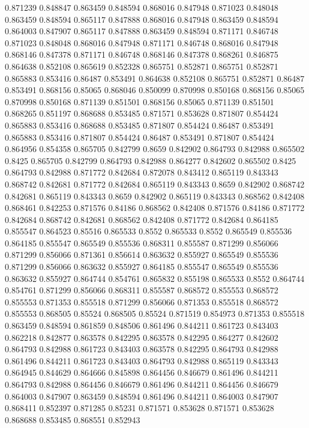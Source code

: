 0.871239 0.848847
0.863459 0.848594
0.868016 0.847948
0.871023 0.848048
0.863459 0.848594
0.865117 0.847888
0.868016 0.847948
0.863459 0.848594
0.864003 0.847907
0.865117 0.847888
0.863459 0.848594
0.871171 0.846748
0.871023 0.848048
0.868016 0.847948
0.871171 0.846748
0.868016 0.847948
0.868146 0.847378
0.871171 0.846748
0.868146 0.847378
0.868261 0.846875
0.864638 0.852108
0.865619 0.852328
0.865751 0.852871
0.865751 0.852871
0.865883 0.853416
0.86487 0.853491
0.864638 0.852108
0.865751 0.852871
0.86487 0.853491
0.868156 0.85065
0.868046 0.850099
0.870998 0.850168
0.868156 0.85065
0.870998 0.850168
0.871139 0.851501
0.868156 0.85065
0.871139 0.851501
0.868265 0.851197
0.868688 0.853485
0.871571 0.853628
0.871807 0.854424
0.865883 0.853416
0.868688 0.853485
0.871807 0.854424
0.86487 0.853491
0.865883 0.853416
0.871807 0.854424
0.86487 0.853491
0.871807 0.854424
0.864956 0.854358
0.865705 0.842799
0.8659 0.842902
0.864793 0.842988
0.865502 0.8425
0.865705 0.842799
0.864793 0.842988
0.864277 0.842602
0.865502 0.8425
0.864793 0.842988
0.871772 0.842684
0.872078 0.843412
0.865119 0.843343
0.868742 0.842681
0.871772 0.842684
0.865119 0.843343
0.8659 0.842902
0.868742 0.842681
0.865119 0.843343
0.8659 0.842902
0.865119 0.843343
0.868562 0.842408
0.868461 0.842253
0.871576 0.84186
0.868562 0.842408
0.871576 0.84186
0.871772 0.842684
0.868742 0.842681
0.868562 0.842408
0.871772 0.842684
0.864185 0.855547
0.864523 0.85516
0.865533 0.8552
0.865533 0.8552
0.865549 0.855536
0.864185 0.855547
0.865549 0.855536
0.868311 0.855587
0.871299 0.856066
0.871299 0.856066
0.871361 0.856614
0.863632 0.855927
0.865549 0.855536
0.871299 0.856066
0.863632 0.855927
0.864185 0.855547
0.865549 0.855536
0.863632 0.855927
0.864744 0.854761
0.865832 0.855198
0.865533 0.8552
0.864744 0.854761
0.871299 0.856066
0.868311 0.855587
0.868572 0.855553
0.868572 0.855553
0.871353 0.855518
0.871299 0.856066
0.871353 0.855518
0.868572 0.855553
0.868505 0.85524
0.868505 0.85524
0.871519 0.854973
0.871353 0.855518
0.863459 0.848594
0.861859 0.848506
0.861496 0.844211
0.861723 0.843403
0.862218 0.842877
0.863578 0.842295
0.863578 0.842295
0.864277 0.842602
0.864793 0.842988
0.861723 0.843403
0.863578 0.842295
0.864793 0.842988
0.861496 0.844211
0.861723 0.843403
0.864793 0.842988
0.865119 0.843343
0.864945 0.844629
0.864666 0.845898
0.864456 0.846679
0.861496 0.844211
0.864793 0.842988
0.864456 0.846679
0.861496 0.844211
0.864456 0.846679
0.864003 0.847907
0.863459 0.848594
0.861496 0.844211
0.864003 0.847907
0.868411 0.852397
0.871285 0.85231
0.871571 0.853628
0.871571 0.853628
0.868688 0.853485
0.868551 0.852943
